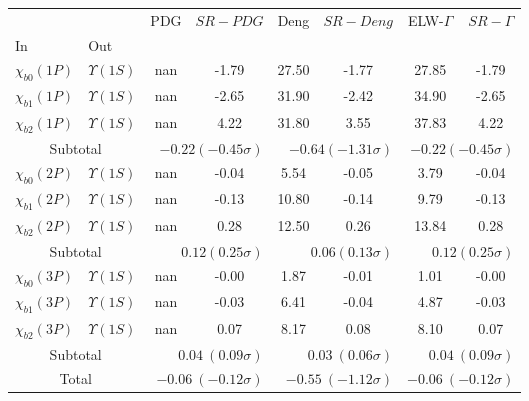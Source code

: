 \begin{tabular}{|l|l|c|c|c|c|c|c|}%
\hline%
&&PDG&$SR-PDG$&Deng&$SR-Deng$&ELW-$\Gamma$&$SR-\Gamma$\\%
In&Out&&&&&&\\%
\hline%
$\chi_{b0}(1P)$&$\Upsilon(1S)$&nan&-1.79&27.50&-1.77&27.85&-1.79\\%
$\chi_{b1}(1P)$&$\Upsilon(1S)$&nan&-2.65&31.90&-2.42&34.90&-2.65\\%
$\chi_{b2}(1P)$&$\Upsilon(1S)$&nan&4.22&31.80&3.55&37.83&4.22\\%
\hline%
\hline%
\multicolumn{2}{|c|}{Subtotal}&\multicolumn{2}{|r|}{$-0.22 (-0.45\sigma)$}&\multicolumn{2}{|r|}{$-0.64 (-1.31\sigma)$}&\multicolumn{2}{|r|}{$-0.22 (-0.45\sigma)$}\\%
\hline%
\hline%
$\chi_{b0}(2P)$&$\Upsilon(1S)$&nan&-0.04&5.54&-0.05&3.79&-0.04\\%
$\chi_{b1}(2P)$&$\Upsilon(1S)$&nan&-0.13&10.80&-0.14&9.79&-0.13\\%
$\chi_{b2}(2P)$&$\Upsilon(1S)$&nan&0.28&12.50&0.26&13.84&0.28\\%
\hline%
\hline%
\multicolumn{2}{|c|}{Subtotal}&\multicolumn{2}{|r|}{$0.12 (0.25\sigma)$}&\multicolumn{2}{|r|}{$0.06 (0.13\sigma)$}&\multicolumn{2}{|r|}{$0.12 (0.25\sigma)$}\\%
\hline%
\hline%
$\chi_{b0}(3P)$&$\Upsilon(1S)$&nan&-0.00&1.87&-0.01&1.01&-0.00\\%
$\chi_{b1}(3P)$&$\Upsilon(1S)$&nan&-0.03&6.41&-0.04&4.87&-0.03\\%
$\chi_{b2}(3P)$&$\Upsilon(1S)$&nan&0.07&8.17&0.08&8.10&0.07\\%
\hline%
\hline%
\multicolumn{2}{|c|}{Subtotal}&\multicolumn{2}{|r|}{$0.04~(0.09\sigma)$}&\multicolumn{2}{|r|}{$0.03~(0.06\sigma)$}&\multicolumn{2}{|r|}{$0.04~(0.09\sigma)$}\\%
\hline%
\hline%
\multicolumn{2}{|c|}{Total}&\multicolumn{2}{|r|}{$-0.06~(-0.12\sigma)$}&\multicolumn{2}{|r|}{$-0.55~(-1.12\sigma)$}&\multicolumn{2}{|r|}{$-0.06~(-0.12\sigma)$}\\%
\hline%
\end{tabular}